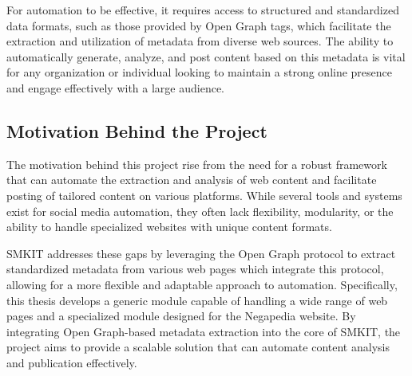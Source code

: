 For automation to be effective, it requires access to structured and standardized data formats, such as those provided by Open Graph tags, which facilitate the extraction and utilization of metadata from diverse web sources. The ability to automatically generate, analyze, and post content based on this metadata is vital for any organization or individual looking to maintain a strong online presence and engage effectively with a large audience.

\subsection{Motivation Behind the Project}
\label{subsec:motivation_behind_the_project}
The motivation behind this project rise from the need for a robust framework that can automate the extraction and analysis of web content and facilitate posting of tailored content on various platforms. While several tools and systems exist for social media automation, they often lack flexibility, modularity, or the ability to handle specialized websites with unique content formats.

SMKIT addresses these gaps by leveraging the Open Graph protocol to extract standardized metadata from various web pages which integrate this protocol, allowing for a more flexible and adaptable approach to automation. Specifically, this thesis develops a generic module capable of handling a wide range of web pages and a specialized module designed for the Negapedia website. By integrating Open Graph-based metadata extraction into the core of SMKIT, the project aims to provide a scalable solution that can automate content analysis and publication effectively.


